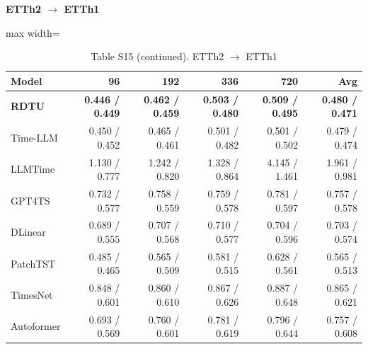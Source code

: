 \begin{table}[H]\centering\small
\caption*{Table S15 (continued). ETTh2 $\to$ ETTh1}
\textbf{ETTh2 $\to$ ETTh1}\par\smallskip
\begin{adjustbox}{max width=\linewidth}\begin{tabular}{lrrrrr}\toprule
\textbf{Model} & \textbf{96} & \textbf{192} & \textbf{336} & \textbf{720} & \textbf{Avg}\\\midrule
\rowcolor{blue!5}
\textbf{RDTU} & \textbf{0.446 / 0.449} & \textbf{0.462 / 0.459} & \textbf{0.503 / 0.480} & \textbf{0.509 / 0.495} & \textbf{0.480 / 0.471}\\
Time-LLM & 0.450 / 0.452 & 0.465 / 0.461 & 0.501 / 0.482 & 0.501 / 0.502 & 0.479 / 0.474\\
LLMTime & 1.130 / 0.777 & 1.242 / 0.820 & 1.328 / 0.864 & 4.145 / 1.461 & 1.961 / 0.981\\
GPT4TS & 0.732 / 0.577 & 0.758 / 0.559 & 0.759 / 0.578 & 0.781 / 0.597 & 0.757 / 0.578\\
DLinear & 0.689 / 0.555 & 0.707 / 0.568 & 0.710 / 0.577 & 0.704 / 0.596 & 0.703 / 0.574\\
PatchTST & 0.485 / 0.465 & 0.565 / 0.509 & 0.581 / 0.515 & 0.628 / 0.561 & 0.565 / 0.513\\
TimesNet & 0.848 / 0.601 & 0.860 / 0.610 & 0.867 / 0.626 & 0.887 / 0.648 & 0.865 / 0.621\\
Autoformer & 0.693 / 0.569 & 0.760 / 0.601 & 0.781 / 0.619 & 0.796 / 0.644 & 0.757 / 0.608\\
\bottomrule\end{tabular}\end{adjustbox}\end{table}
